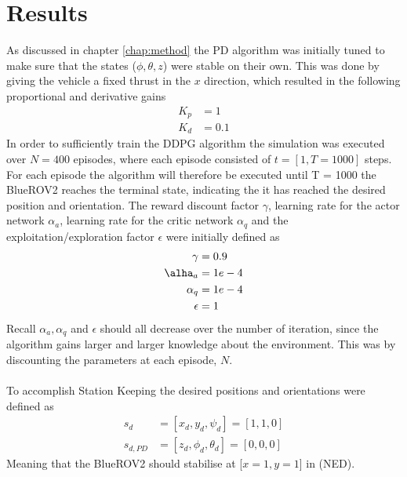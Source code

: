\chapter{Results}
As discussed in chapter \ref{chap:method} the PD algorithm was initially tuned to make sure that the states ($\phi, \theta, z$) were stable on their own. This was done by giving the vehicle a fixed thrust in the $x$ direction, which resulted in the following proportional and derivative gains
\begin{align}
    K_{p} & = 1 \\
    K_{d} & = 0.1
\end{align}
In order to sufficiently train the DDPG algorithm the simulation was executed over $N = 400$ episodes, where each episode consisted of $t = [1, T=1000]$ steps. For each episode the algorithm will therefore be executed until T = 1000  the BlueROV2 reaches the terminal state, indicating the it has reached the desired position and orientation. The reward discount factor $\gamma$, learning rate for the actor network $\alpha_{a}$, learning rate for the critic network $\alpha_{q}$ and the exploitation/exploration factor $\epsilon$ were initially defined as
\begin{align}
    \gamma & = 0.9 \\
    \alha_{a} & = 1e-4 \\
    \alpha_{q} & = 1e-4 \\
    \epsilon & = 1
\end{align}
Recall $\alpha_{a}, \alpha_{q}$ and $\epsilon$ should all decrease over the number of iteration, since the algorithm gains larger and larger knowledge about the environment. This was by discounting the parameters at each episode, $N$.\\\\
To accomplish Station Keeping the desired positions and orientations were defined as
\begin{align}
    s_{d} & = [x_{d}, y_{d}, \psi_{d}] = [1, 1, 0] \\
    s_{d,PD} & = [z_{d}, \phi_{d}, \theta_{d}] = [0, 0, 0]
\end{align}
Meaning that the BlueROV2 should stabilise at [$x = 1, y = 1$] in (NED).  
